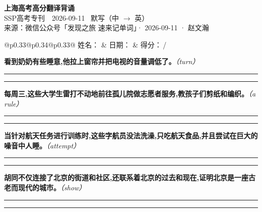\documentclass[11pt,a4paper]{article}
\newcommand{\num}[1]{\makebox[1.9em][r]{#1.}\hspace{0.3em}}
\newcommand{\wline}{\noindent\rule{\linewidth}{0.4pt}}
\newcommand{\prompt}[1]{\emph{\textcolor{tipblue}{\small（#1）}}}
\begin{document}
\pagestyle{plain}
\begin{center}
{\LARGE\bfseries 上海高考高分翻译背诵 }\\[0.25em]
{\large SSP高考专刊　2026-09-11 \quad\ 默写（中 $\to$ 英）}\\[0.35em]
{\footnotesize 来源：微信公众号「发现之旅 速来记单词」· 2026-09-11 · 赵文瀚}
\end{center}

\vspace{0.4em}
\noindent\begin{tabular}{@{}p{0.33\textwidth}@{}p{0.34\textwidth}@{}p{0.33\textwidth}@{}}
姓名：\underline{\hspace{2.0cm}} & 日期：\underline{\hspace{2.0cm}} & 得分：\underline{\hspace{1.4cm}}\,/ \\
\end{tabular}

\vspace{0.5em}

\vspace{0.8em}
\num{1}\textbf{看到奶奶有些睡意,他拉上窗帘并把电视的音量调低了。}\prompt{turn}

\vspace{0.3em}

\wline\vspace{0.3em}
\wline

\num{2}\textbf{每周三,这些大学生雷打不动地前往孤儿院做志愿者服务,教孩子们剪纸和编织。}\prompt{a rule}

\vspace{0.3em}

\wline\vspace{0.3em}
\wline

\num{3}\textbf{当针对航天任务进行训练时,这些字航员没法洗澡,只吃航天食品,并且尝试在巨大的噪音中人睡。}\prompt{attempt}

\vspace{0.3em}

\wline\vspace{0.3em}
\wline

\num{4}\textbf{胡同不仅连接了北京的街道和社区,还联系着北京的过去和现在,证明北京是一座古老而现代的城市。}\prompt{show}

\vspace{0.3em}

\wline\vspace{0.3em}
\wline
\end{document}

